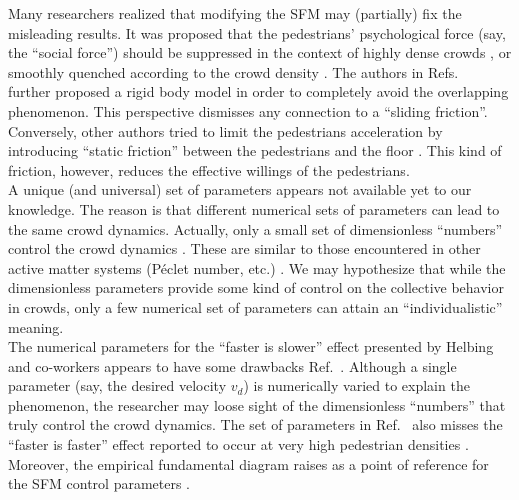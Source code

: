 \documentclass[preprint,12pt]{elsarticle}
\begin{document}
Many researchers realized that modifying the SFM may (partially)
fix the misleading results. It was proposed that the pedestrians' 
psychological force (say, the ``social force'') should be suppressed in the 
context of highly dense crowds 
\cite{pelechano_2007,moussaid_2011,alonso_2014,bottinelli_2017}, or smoothly 
quenched according to the crowd density \cite{song_2019}. The authors in 
Refs.~\cite{kabalan_2017,jebrane_2019} further proposed a rigid body model in 
order to completely avoid the overlapping phenomenon. This perspective 
dismisses 
any connection to a ``sliding friction''. Conversely, other authors tried to 
limit the pedestrians acceleration by introducing ``static friction'' between 
the pedestrians and the floor \cite{wang_2019}. This kind of friction, however, 
reduces the effective willings of the pedestrians.  \\  

A unique (and universal) set of parameters appears not
available yet to our knowledge. 
 The reason is that different numerical sets of parameters can lead to 
the same crowd dynamics. Actually, only a small set of dimensionless 
``numbers'' control the crowd dynamics \cite{dorso_2019}. These are similar to 
those encountered in other active matter systems (P\'eclet number, etc.)  
\cite{marchetti_2014}. We may hypothesize that while the dimensionless 
parameters provide some kind of control on the 
collective behavior in 
crowds, only a few numerical set of parameters can attain an ``individualistic'' 
meaning. 
 \\

The numerical parameters for the ``faster is slower'' effect presented by 
Helbing and co-workers appears to have some drawbacks 
Ref.~\cite{helbing_2000,dorso_2017,dorso_2019}. Although a single 
parameter (say, the desired velocity $v_d$) is numerically varied to 
explain the phenomenon, the researcher may loose sight of the dimensionless 
``numbers'' that truly control the crowd dynamics. The set of parameters in 
Ref.~\cite{helbing_2000} also misses the ``faster is faster'' effect reported 
to occur at very high pedestrian densities \cite{dorso_2017,haghani_2019}. 
Moreover, the empirical fundamental diagram raises as a point of reference 
for the SFM control parameters \cite{helbing_2007,dorso_2017}. \\
\end{document}

